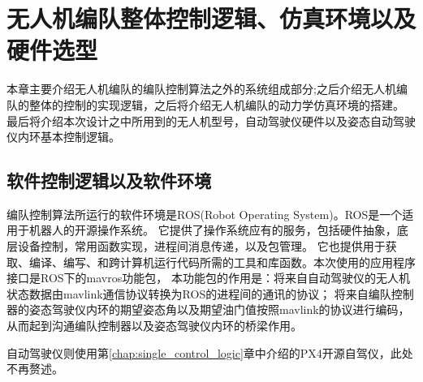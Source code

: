 \chapter{无人机编队整体控制逻辑、仿真环境以及硬件选型}
\label{chap:hardware}
本章主要介绍无人机编队的编队控制算法之外的系统组成部分;之后介绍无人机编队的整体的控制的实现逻辑，之后将介绍无人机编队的动力学仿真环境的搭建。
最后将介绍本次设计之中所用到的无人机型号，自动驾驶仪硬件以及姿态自动驾驶仪内环基本控制逻辑。
\section{ 软件控制逻辑以及软件环境 }
编队控制算法所运行的软件环境是ROS(Robot Operating System)。ROS是一个适用于机器人的开源操作系统。
它提供了操作系统应有的服务，包括硬件抽象，底层设备控制，常用函数实现，进程间消息传递，以及包管理。
它也提供用于获取、编译、编写、和跨计算机运行代码所需的工具和库函数。本次使用的应用程序接口是ROS下的mavros功能包，
本功能包的作用是：将来自自动驾驶仪的无人机状态数据由mavlink通信协议转换为ROS的进程间的通讯的协议；
将来自编队控制器的姿态驾驶仪内环的期望姿态角以及期望油门值按照mavlink的协议进行编码，从而起到沟通编队控制器以及姿态驾驶仪内环的桥梁作用。

自动驾驶仪则使用第\ref{chap:single_control_logic}章中介绍的PX4开源自驾仪，此处不再赘述。
